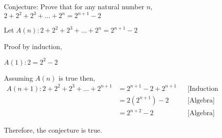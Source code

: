 \documentclass[a4paper]{article}
\begin{document}
Conjecture: Prove that for any natural number $n$, $2 + 2^2 + 2^3 + \dots + 2^n = 2^{n+1} - 2$

Let $A(n): 2 + 2^2 + 2^3 + \dots + 2^n = 2^{n+1} - 2$

Proof by induction,

$A(1): 2 = 2^2 - 2$

Assuming $A(n)$ is true then,
\begin{align*}
  A(n+1): 2 + 2^2 + 2^3 + \dots + 2^{n+1} &= 2^{n+1} - 2 + 2^{n+1} && \text{[Induction hypothesis]} \\
  &= 2(2^{n+1}) - 2 && \text{[Algebra]} \\
  &= 2^{n+2} - 2 && \text{[Algebra]}
\end{align*}

Therefore, the conjecture is true.
\end{document}
